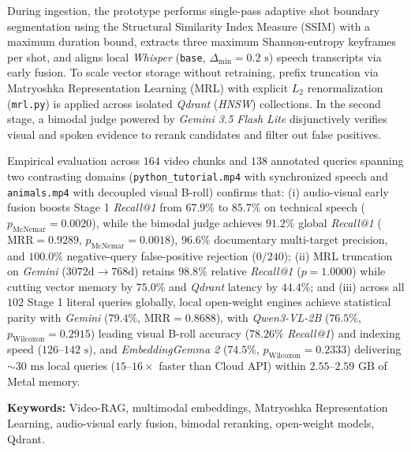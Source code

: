 During ingestion, the prototype performs single-pass adaptive shot boundary segmentation using the Structural Similarity Index Measure (SSIM) with a maximum duration bound, extracts three maximum Shannon-entropy keyframes per shot, and aligns local \textit{Whisper} (\texttt{base}, $\Delta_{\min} = 0.2\text{ s}$) speech transcripts via early fusion. To scale vector storage without retraining, prefix truncation via Matryoshka Representation Learning (MRL) with explicit $L_2$ renormalization (\texttt{mrl.py}) is applied across isolated \textit{Qdrant} (\textit{HNSW}) collections. In the second stage, a bimodal judge powered by \textit{Gemini 3.5 Flash Lite} disjunctively verifies visual and spoken evidence to rerank candidates and filter out false positives.

Empirical evaluation across $164$ video chunks and $138$ annotated queries spanning two contrasting domains (\texttt{python\_tutorial.mp4} with synchronized speech and \texttt{animals.mp4} with decoupled visual B-roll) confirms that: (i) audio-visual early fusion boosts Stage 1 \textit{Recall@1} from $67.9\%$ to $85.7\%$ on technical speech ($p_{\text{McNemar}} = 0.0020$), while the bimodal judge achieves $91.2\%$ global \textit{Recall@1} ($\text{MRR} = 0.9289$, $p_{\text{McNemar}} = 0.0018$), $96.6\%$ documentary multi-target precision, and $100.0\%$ negative-query false-positive rejection ($0/240$); (ii) MRL truncation on \textit{Gemini} ($3072\text{d} \to 768\text{d}$) retains $98.8\%$ relative \textit{Recall@1} ($p = 1.0000$) while cutting vector memory by $75.0\%$ and \textit{Qdrant} latency by $44.4\%$; and (iii) across all $102$ Stage 1 literal queries globally, local open-weight engines achieve statistical parity with \textit{Gemini} ($79.4\%$, $\text{MRR} = 0.8688$), with \textit{Qwen3-VL-2B} ($76.5\%$, $p_{\text{Wilcoxon}} = 0.2915$) leading visual B-roll accuracy ($78.26\%$ \textit{Recall@1}) and indexing speed ($126$--$142\text{ s}$), and \textit{EmbeddingGemma 2} ($74.5\%$, $p_{\text{Wilcoxon}} = 0.2333$) delivering $\sim 30\text{ ms}$ local queries ($15$--$16\times$ faster than Cloud API) within $2.55$--$2.59\text{ GB}$ of Metal memory.

\vspace{1em}
\noindent\textbf{Keywords:} Video-RAG, multimodal embeddings, Matryoshka Representation Learning, audio-visual early fusion, bimodal reranking, open-weight models, Qdrant.

\clearpage
\pagestyle{fancy}
